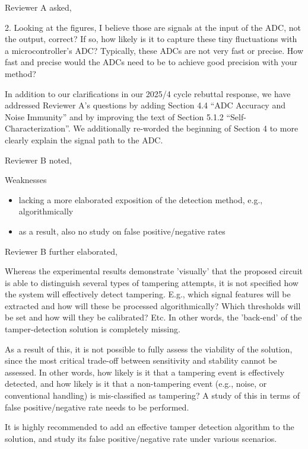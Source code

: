 \documentclass[a4paper, 10pt]{article}
\begin{document}
Reviewer A asked,
\begin{displayquote}
2. Looking at the figures, I believe those are signals at the input of the ADC, not the output, correct? If so, how
likely is it to capture these tiny fluctuations with a microcontroller's ADC? Typically, these ADCs are not very fast or
precise. How fast and precise would the ADCs need to be to achieve good precision with your method?
\end{displayquote}

In addition to our clarifications in our 2025/4 cycle rebuttal response, we have addressed Reviewer A's questions by
adding Section 4.4 ``ADC Accuracy and Noise Immunity'' and by improving the text of Section 5.1.2
``Self-Characterization''. We additionally re-worded the beginning of Section 4 to more clearly explain the signal path
to the ADC.

Reviewer B noted,
\begin{displayquote}
Weaknesses
    \begin{itemize}
        \item lacking a more elaborated exposition of the detection method, e.g., algorithmically
        \item as a result, also no study on false positive/negative rates
    \end{itemize}
\end{displayquote}

Reviewer B further elaborated,
\begin{displayquote}
    Whereas the experimental results demonstrate 'visually' that the proposed circuit is able to distinguish several
    types of tampering attempts, it is not specified how the system will effectively detect tampering. E.g., which
    signal features will be extracted and how will these be processed algorithmically? Which thresholds will be set and
    how will they be calibrated? Etc. In other words, the 'back-end' of the tamper-detection solution is completely
    missing.

    As a result of this, it is not possible to fully assess the viability of the solution, since the most critical
    trade-off between sensitivity and stability cannot be assessed. In other words, how likely is it that a tampering
    event is effectively detected, and how likely is it that a non-tampering event (e.g., noise, or conventional
    handling) is mis-classified as tampering? A study of this in terms of false positive/negative rate needs to be
    performed.

    It is highly recommended to add an effective tamper detection algorithm to the solution, and study its false
    positive/negative rate under various scenarios.
\end{displayquote}
\end{document}
